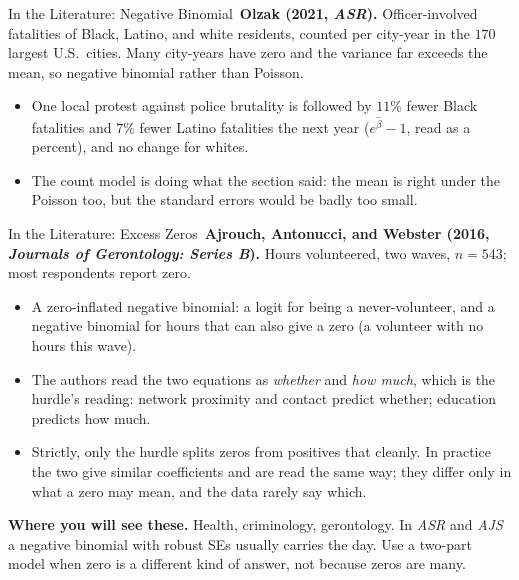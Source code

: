 \documentclass[aspectratio=169,11pt,xcolor=dvipsnames]{beamer}
\newcommand{\core}{\,\raisebox{0.6pt}{\textcolor{corestar}{$\bigstar$}}}
\begin{document}
\begin{frame}{In the Literature: Negative Binomial\core}
\textbf{Olzak (2021, \emph{ASR}).} Officer-involved fatalities of Black,
Latino, and white residents, counted per city-year in the $170$ largest
U.S.\ cities. Many city-years have zero and the variance far exceeds the
mean, so negative binomial rather than Poisson.
\begin{itemize}\itemsep3pt
  \item One local protest against police brutality is followed by $11\%$
        fewer Black fatalities and $7\%$ fewer Latino fatalities the next
        year ($e^{\hat\beta} - 1$, read as a percent), and no change for
        whites.
  \item The count model is doing what the section said: the mean is right
        under the Poisson too, but the standard errors would be badly
        too small.
\end{itemize}
\end{frame}

\begin{frame}{In the Literature: Excess Zeros\core}
\textbf{Ajrouch, Antonucci, and Webster (2016, \emph{Journals of
Gerontology: Series B}).} Hours volunteered, two waves, $n = 543$; most
respondents report zero.
\begin{itemize}\itemsep3pt
  \item A zero-inflated negative binomial: a logit for being a
        never-volunteer, and a negative binomial for hours that can also
        give a zero (a volunteer with no hours this wave).
  \item The authors read the two equations as \emph{whether} and
        \emph{how much}, which is the hurdle's reading: network proximity
        and contact predict whether; education predicts how much.
  \item Strictly, only the hurdle splits zeros from positives that
        cleanly. In practice the two give similar coefficients and are
        read the same way; they differ only in what a zero may mean, and
        the data rarely say which.
\end{itemize}
\vskip2pt
\textbf{Where you will see these.} Health, criminology, gerontology. In
\emph{ASR} and \emph{AJS} a negative binomial with robust SEs usually
carries the day. Use a two-part model when zero is a different kind of
answer, not because zeros are many.
\end{frame}

\end{document}
